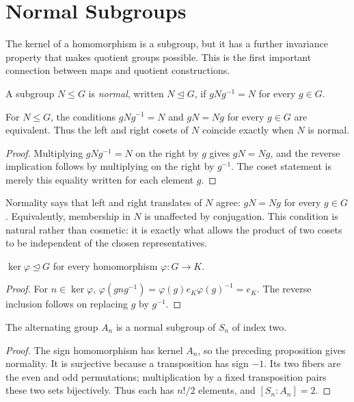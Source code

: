 \section{Normal Subgroups}

The kernel of a homomorphism is a subgroup, but it has a further invariance
property that makes quotient groups possible. This is the first important
connection between maps and quotient constructions.

\begin{definition}
A subgroup \(N\leq G\) is \emph{normal}, written \(N\trianglelefteq G\), if
\(gNg^{-1}=N\) for every \(g\in G\).
\end{definition}

\begin{proposition}
For \(N\leq G\), the conditions \(gNg^{-1}=N\) and \(gN=Ng\) for every
\(g\in G\) are equivalent.  Thus the left and right cosets of \(N\) coincide
exactly when \(N\) is normal.
\end{proposition}
\begin{proof}
Multiplying \(gNg^{-1}=N\) on the right by \(g\) gives \(gN=Ng\), and the
reverse implication follows by multiplying on the right by \(g^{-1}\).  The
coset statement is merely this equality written for each element \(g\).
\end{proof}

Normality says that left and right translates of \(N\) agree:
\(gN=Ng\) for every \(g\in G\).  Equivalently, membership in \(N\) is
unaffected by conjugation.  This condition is natural rather than cosmetic:
it is exactly what allows the product of two cosets to be independent of the
chosen representatives.

\begin{proposition}
\(\ker\varphi\trianglelefteq G\) for every homomorphism \(\varphi:G\to K\).
\end{proposition}
\begin{proof}
For \(n\in\ker\varphi\), \(\varphi(gng^{-1})=\varphi(g)e_K\varphi(g)^{-1}=e_K\).
The reverse inclusion follows on replacing \(g\) by \(g^{-1}\).
\end{proof}

\begin{corollary}
The alternating group \(A_n\) is a normal subgroup of \(S_n\) of index two.
\end{corollary}
\begin{proof}
The sign homomorphism has kernel \(A_n\), so the preceding proposition gives
normality.  It is surjective because a transposition has sign \(-1\).  Its
two fibers are the even and odd permutations; multiplication by a fixed
transposition pairs these two sets bijectively.  Thus each has \(n!/2\)
elements, and \([S_n:A_n]=2\).
\end{proof}


